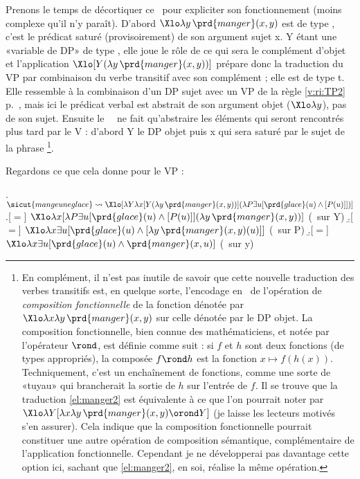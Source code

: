 Prenons le temps de décortiquer ce \lterme\ pour expliciter son fonctionnement (moins complexe qu'il n'y paraît).  
D'abord $\Xlo\lambda y\,\prd{manger}(x,y)$ est de type \et, c'est le prédicat  saturé (provisoirement) de son argument sujet \vrb x. \vrb Y étant une «variable de DP» de type \ett, elle joue le rôle de ce qui sera le complément d'objet et l'application $\Xlo[Y(\lambda y\,\prd{manger}(x,y))]$ prépare donc la traduction du VP par combinaison du verbe transitif avec son complément ; elle est de type \typ t. Elle ressemble à la combinaison d'un DP sujet avec un VP de la règle \ref{v:ri:TP2} p.~\pageref{v:ri:TP2}, mais ici le prédicat verbal est abstrait de son argument objet ($\Xlo\lambda y$), pas de son sujet.
Ensuite le \lterme\ \Last\ ne fait qu'abstraire les éléments qui seront rencontrés plus tard par le V : d'abord \vrb Y le DP objet puis \vrb x qui sera saturé par le sujet de la phrase
\footnote{En complément, il n'est pas inutile de savoir que cette nouvelle traduction des verbes transitifs est, en quelque sorte, l'encodage en \lcalcul\ de l'opération de \emph{composition fonctionnelle} de la fonction dénotée par $\Xlo\lambda x\lambda y\,\prd{manger}(x,y)$ sur celle dénotée par le DP objet. La composition fonctionnelle, bien connue des mathématiciens, et notée par l'opérateur $\rond$, est définie comme suit : si $f$ et $h$ sont deux fonctions (de types appropriés), la composée $f\rond h$ est la fonction \(x\mapsto f(h(x))\). Techniquement, c'est un enchaînement de
fonctions, comme une sorte de «tuyau» qui brancherait la sortie de $h$
sur l'entrée de $f$. Il se trouve que la traduction \ref{el:manger2} est équivalente à ce que l'on pourrait noter par \(\Xlo\lambda Y[\lambda x\lambda y\,\prd{manger}(x,y)\orond Y]\) (je laisse les lecteurs motivés s'en assurer).  Cela indique que la composition fonctionnelle pourrait constituer une autre opération de composition sémantique, complémentaire de l'application fonctionnelle.  Cependant je ne développerai pas davantage cette option ici, sachant que \ref{el:manger2}, en soi, réalise la même opération.
}.


Regardons ce que cela donne pour le VP  :

\ex.
\(\sicut{mange une glace} \leadsto
\Xlo[\lambda Y\lambda x[Y(\lambda y\,\prd{manger}(x,y))](\lambda P\exists u[\prd{glace}(u) \wedge [P(u)]])]\)
\a.[$=$]
\(\Xlo\lambda x[\lambda P\exists u[\prd{glace}(u) \wedge [P(u)]](\lambda y\,\prd{manger}(x,y))]\)
\hfill{\small(\breduc\ sur \vrb Y)}
\b.[$=$]
\(\Xlo\lambda x\exists u[\prd{glace}(u) \wedge [\lambda y\,\prd{manger}(x,y)(u)]]\)
\hfill{\small(\breduc\ sur \vrb P)}
\b.[$=$]
\(\Xlo\lambda x\exists u[\prd{glace}(u) \wedge \prd{manger}(x,u)]\)
\hfill{\small(\breduc\ sur \vrb y)}


